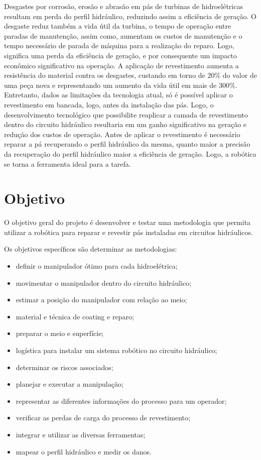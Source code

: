 Desgastes por corrosão, erosão e abrasão em pás de turbinas de hidroelétricas
resultam em perda do perfil hidráulico, reduzindo assim a eficiência de geração.
O desgaste reduz também a vida útil da turbina, o tempo de operação entre
paradas de manutenção, assim como, aumentam os custos de manutenção e o tempo
necessário de parada de máquina para a realização do reparo. Logo, significa uma
perda da eficiência de geração, e por consequente um impacto econômico
significativo na operação.
A aplicação de revestimento aumenta a resistência do material contra os
desgastes, custando em torno de 20\% do valor de uma peça nova e representando
um aumento da vida útil em mais de 300\%. Entretanto, dados as limitações da
tecnologia atual, só é possível aplicar o revestimento em bancada, logo, antes
da instalação das pás. Logo, o desenvolvimento tecnológico que possibilite
reaplicar a camada de revestimento dentro do circuito hidráulico resultaria em
um ganho significativo na geração e redução dos custos de operação.
Antes de aplicar o revestimento é necessário reparar a pá recuperando o perfil
hidráulico da mesma, quanto maior a precisão da recuperação do perfil hidráulico
maior a eficiência de geração. Logo, a robótica se torna a ferramenta ideal para a tarefa.

\section{Objetivo}

O objetivo geral do projeto é desenvolver e testar uma metodologia que permita
utilizar a robótica para reparar e revestir pás instaladas em circuitos hidráulicos.

Os objetivos específicos são determinar as metodologias: 

\begin{itemize}
  \item definir o manipulador ótimo para cada hidroelétrica; 
  \item movimentar o manipulador dentro do circuito hidráulico;
  \item estimar a posição do manipulador com relação ao meio;
  \item material e técnica de coating e reparo; 
  \item preparar o meio e superfície;
  \item logística para instalar um sistema robótico no circuito hidráulico;
  \item determinar os riscos associados;
  \item planejar e executar a manipulação;
  \item representar as diferentes informações do processo para um operador;
  \item verificar as perdas de carga do processo de revestimento;
  \item integrar e utilizar as diversas ferramentas;
  \item mapear o perfil hidráulico e medir os danos.
\end{itemize}

